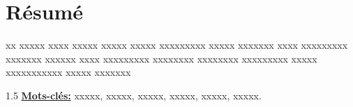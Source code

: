 \chapter*{Résumé}
\adjustmtc
\thispagestyle{MyStyle}

xx xxxxx xxxx xxxxx xxxxx xxxxx xxxxxxxxx xxxxx xxxxxxx xxxx xxxxxxxxx xxxxxxx xxxxxx xxxx xxxxxxxxx xxxxxxxx xxxxxxxx xxxxxxxxx xxxxx xxxxxxxxxxx xxxxx xxxxxxx 



\begin{spacing}{1.5}
	\underline{\textbf{Mots-clés:}} xxxxx, xxxxx, xxxxx, xxxxx, xxxxx, xxxxx.\\
\end{spacing}